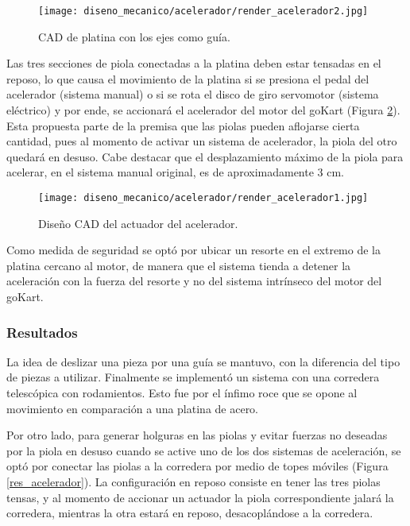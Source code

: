 \begin{figure}[H]
\begin{center}
	\texttt{[image: diseno\_mecanico/acelerador/render\_acelerador2.jpg]}
	\caption{CAD de platina con los ejes como guía.}
	\label{platina}
\end{center}
\end{figure}

Las tres secciones de piola conectadas a la platina deben estar tensadas en el reposo, lo que causa el movimiento de la platina si se presiona el pedal del acelerador (sistema manual) o si se rota el disco de giro servomotor (sistema eléctrico) y por ende, se accionará el acelerador del motor del goKart (Figura \ref{cad_acelerador}). Esta propuesta parte de la premisa que las piolas pueden aflojarse cierta cantidad, pues al momento de activar un sistema de acelerador, la piola del otro quedará en desuso. Cabe destacar que el desplazamiento máximo de la piola para acelerar, en el sistema manual original, es de aproximadamente 3 cm.

\begin{figure}[H]
\begin{center}
	\texttt{[image: diseno\_mecanico/acelerador/render\_acelerador1.jpg]}
	\caption{Diseño CAD del actuador del acelerador.}
	\label{cad_acelerador}
\end{center}
\end{figure}

Como medida de seguridad se optó por ubicar un resorte en el extremo de la platina cercano al motor, de manera que el sistema tienda a detener la aceleración con la fuerza del resorte y no del sistema intrínseco del motor del goKart.


\subsubsection{Resultados}

La idea de deslizar una pieza por una guía se mantuvo, con la diferencia del tipo de piezas a utilizar. Finalmente se implementó un sistema con una corredera telescópica con rodamientos. Esto fue por el ínfimo roce que se opone al movimiento en comparación a una platina de acero.

Por otro lado, para generar holguras en las piolas y evitar fuerzas no deseadas por la piola en desuso cuando se active uno de los dos sistemas de aceleración, se optó por conectar las piolas a la corredera por medio de topes móviles (Figura \ref{res_acelerador}). La configuración en reposo consiste en tener las tres piolas tensas, y al momento de accionar un actuador la piola correspondiente jalará la corredera, mientras la otra estará en reposo, desacoplándose a la corredera.

